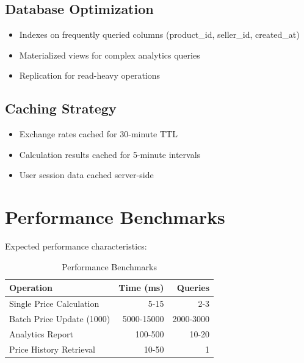 \documentclass[12pt,a4paper,oneside]{report}
\begin{document}
\subsection{Database Optimization}

\begin{itemize}
    \item Indexes on frequently queried columns (product\_id, seller\_id, created\_at)
    \item Materialized views for complex analytics queries
    \item Replication for read-heavy operations
\end{itemize}

\subsection{Caching Strategy}

\begin{itemize}
    \item Exchange rates cached for 30-minute TTL
    \item Calculation results cached for 5-minute intervals
    \item User session data cached server-side
\end{itemize}

\section{Performance Benchmarks}

Expected performance characteristics:

\begin{table}[H]
    \centering
    \begin{tabular}{lrr}
        \toprule
        \textbf{Operation} & \textbf{Time (ms)} & \textbf{Queries} \\
        \midrule
        Single Price Calculation & 5-15 & 2-3 \\
        Batch Price Update (1000) & 5000-15000 & 2000-3000 \\
        Analytics Report & 100-500 & 10-20 \\
        Price History Retrieval & 10-50 & 1 \\
        \bottomrule
    \end{tabular}
    \caption{Performance Benchmarks}
    \label{tab:benchmarks}
\end{table}

\newpage
\end{document}
